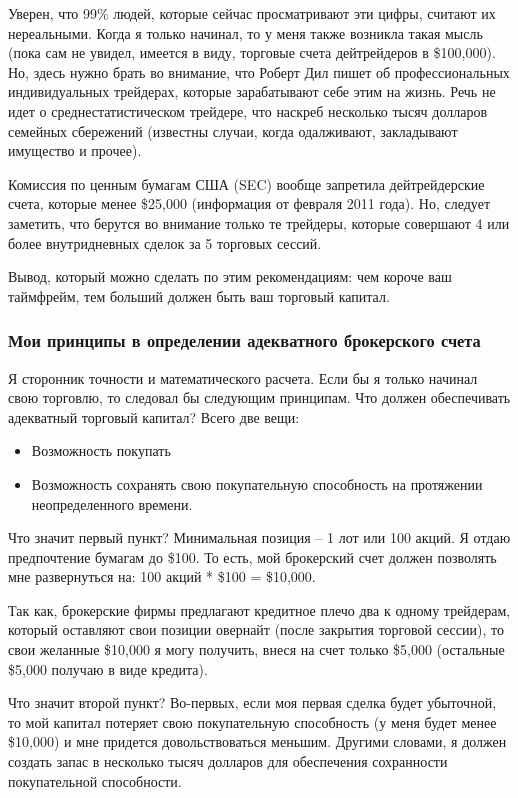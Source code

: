 \documentclass[a5paper]{article}
\begin{document}
Уверен, что 99\% людей, которые сейчас просматривают эти цифры, считают их нереальными. Когда я только начинал, то у меня также возникла такая мысль (пока сам не увидел, имеется в виду, торговые счета дейтрейдеров в \$100,000). Но, здесь нужно брать во внимание, что Роберт Дил пишет об профессиональных индивидуальных трейдерах, которые зарабатывают себе этим на жизнь. Речь не идет о среднестатистическом трейдере, что наскреб несколько тысяч долларов семейных сбережений (известны случаи, когда одалживают, закладывают имущество и прочее).

Комиссия по ценным бумагам США (SEC) вообще запретила дейтрейдерские счета, которые менее \$25,000 (информация от февраля 2011 года). Но, следует заметить, что берутся во внимание только те трейдеры, которые совершают 4 или более внутридневных сделок за 5 торговых сессий.

Вывод, который можно сделать по этим рекомендациям: чем короче ваш
таймфрейм, тем больший должен быть ваш торговый капитал.

\subsubsection{Мои принципы в определении адекватного брокерского
  счета}

Я сторонник точности и математического расчета. Если бы я только начинал свою торговлю, то следовал бы следующим принципам. Что должен обеспечивать адекватный торговый капитал? Всего две вещи:
\begin{itemize}
\item     Возможность покупать
\item     Возможность сохранять свою покупательную способность на протяжении неопределенного времени.
\end{itemize}

Что значит первый пункт? Минимальная позиция – 1 лот или 100 акций. Я отдаю предпочтение бумагам до \$100. То есть, мой брокерский счет должен позволять мне развернуться на: 100 акций * \$100 = \$10,000.

Так как, брокерские фирмы предлагают кредитное плечо два к одному трейдерам, который оставляют свои позиции овернайт (после закрытия торговой сессии), то свои желанные \$10,000 я могу получить, внеся на счет только \$5,000 (остальные \$5,000 получаю в виде кредита).

Что значит второй пункт? Во-первых, если моя первая сделка будет убыточной, то мой капитал потеряет свою покупательную способность (у меня будет менее \$10,000) и мне придется довольствоваться меньшим. Другими словами, я должен создать запас в несколько тысяч долларов для обеспечения сохранности покупательной способности.
\end{document}
